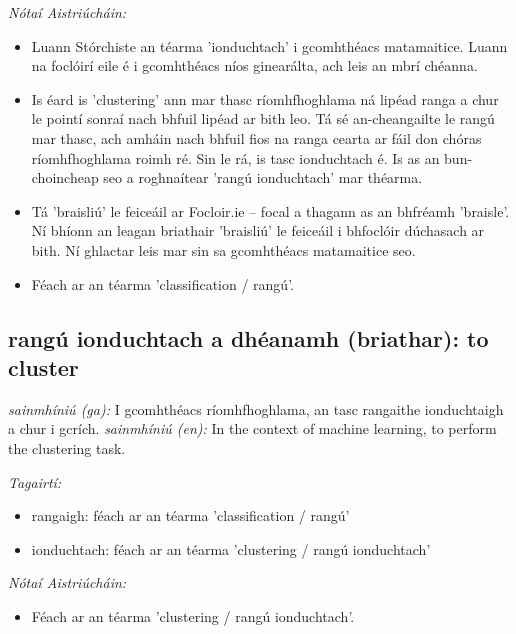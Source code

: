 \documentclass{article}
\begin{document}
 \noindent \textit{Nótaí Aistriúcháin:}
\begin{itemize}
	\item Luann Stórchiste an téarma 'ionduchtach' i gcomhthéacs matamaitice. Luann na foclóirí eile é i gcomhthéacs níos ginearálta, ach leis an mbrí chéanna.
	\item Is éard is 'clustering' ann mar thasc ríomhfhoghlama ná lipéad ranga a chur le pointí sonraí nach bhfuil lipéad ar bith leo. Tá sé an-cheangailte le rangú mar thasc, ach amháin nach bhfuil fios na ranga cearta ar fáil don chóras ríomhfhoghlama roimh ré. Sin le rá, is tasc ionduchtach é. Is as an bun-choincheap seo a roghnaítear 'rangú ionduchtach' mar théarma.
	\item Tá 'braisliú' le feiceáil ar Focloir.ie -- focal a thagann as an bhfréamh 'braisle'. Ní bhíonn an leagan briathair 'braisliú' le feiceáil i bhfoclóir dúchasach ar bith. Ní ghlactar leis mar sin sa gcomhthéacs matamaitice seo.
	\item Féach ar an téarma 'classification / rangú'.
\end{itemize}


\subsection*{rangú ionduchtach a dhéanamh (briathar): to cluster} 
 \noindent \textit{sainmhíniú (ga):} I gcomhthéacs ríomhfhoghlama, an tasc rangaithe ionduchtaigh a chur i gcrích.
\newline\newline
 \noindent \textit{sainmhíniú (en):} In the context of machine learning, to perform the clustering task.
\newline

 \noindent \textit{Tagairtí:}
\begin{itemize}
	\item rangaigh: féach ar an téarma 'classification / rangú'
	\item ionduchtach: féach ar an téarma 'clustering / rangú ionduchtach'
\end{itemize}

 \noindent \textit{Nótaí Aistriúcháin:}
\begin{itemize}
	\item Féach ar an téarma 'clustering / rangú ionduchtach'.
\end{itemize}
\end{document}
